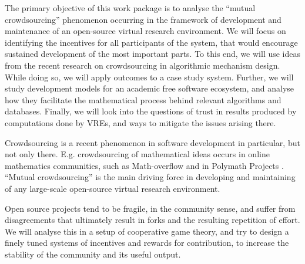 \begin{workpackage}[id=social-aspects,wphases=1-48!.5,
  title=Social Aspects,
  lead=UO,
  UORM=1,USHRM=8, USORM=5]


\begin{wpobjectives}

The primary objective of this work package is to analyse the ``mutual crowdsourcing''
phenomenon occurring in the framework of development and maintenance of an open-source 
virtual research environment. 
We will focus on identifying the incentives for all
participants of the system, that would encourage sustained development of the
most important parts.  To this end, we will use ideas from the
recent research on crowdsourcing in algorithmic mechanism design.
While doing so, we will apply outcomes to a case study
system.
Further, we will study development models for an academic free software ecosystem,
and analyse how they facilitate the mathematical process behind
relevant  algorithms and databases.
Finally, we will look into the questions of trust in results produced
by computations done by VREs, and ways to mitigate the issues arising there.
\end{wpobjectives}

\begin{wpdescription}
Crowdsourcing is a recent phenomenon
in software development in particular, but not only there. E.g. 
crowdsourcing of mathematical ideas occurs in online
mathematics communities, such as Math-overflow \cite{mathoverflow} and
in Polymath Projects \cite{polymath}. 
``Mutual crowdsourcing'' is the main driving force
in developing and maintaining of any large-scale open-source 
virtual research environment. 

Open source projects tend to be fragile, in the community sense, and
suffer from disagreements that ultimately result in forks and
the resulting repetition of effort. We will analyse this in 
a setup of cooperative game theory, and try to design
a finely tuned systems of incentives and rewards for contribution, to increase
the stability of the community and its useful output.


\end{wpdescription}
\end{workpackage}
